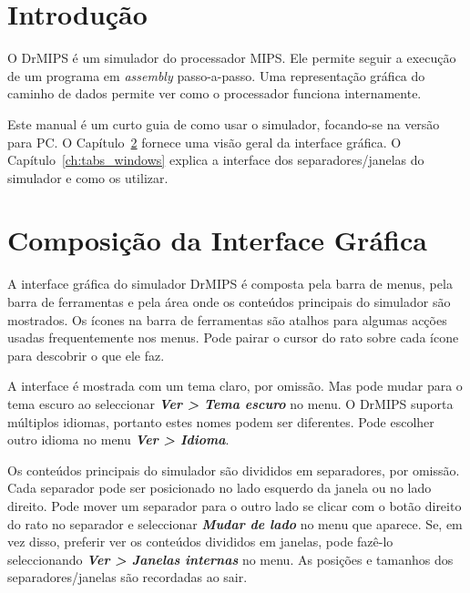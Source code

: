 \documentclass[11pt,a4paper,twoside,titlepage]{report}
\author{Bruno Nova}
\title{\Title}
\newcommand{\menupath}[1]{\textbf{\emph{#1}}}
\begin{document}
\maketitle
\tableofcontents


\chapter{Introdução}

O DrMIPS é um simulador do processador MIPS.
Ele permite seguir a execução de um programa em \emph{assembly}
passo-a-passo. Uma representação gráfica do caminho de dados permite ver
como o processador funciona internamente.

Este manual é um curto guia de como usar o simulador, focando-se
na versão para PC.
O Capítulo~\ref{ch:composition} fornece uma visão geral da interface gráfica.
O Capítulo~\ref{ch:tabs_windows} explica a interface dos separadores/janelas
do simulador e como os utilizar.


\chapter{Composição da Interface Gráfica} \label{ch:composition}

A interface gráfica do simulador DrMIPS é composta pela barra de menus, pela
barra de ferramentas e pela área onde os conteúdos principais do simulador são
mostrados.
Os ícones na barra de ferramentas são atalhos para algumas acções usadas
frequentemente nos menus. Pode pairar o cursor do rato sobre cada ícone para
descobrir o que ele faz.

A interface é mostrada com um tema claro, por omissão. Mas pode mudar para o
tema escuro ao seleccionar \menupath{Ver > Tema escuro} no menu.
O DrMIPS suporta múltiplos idiomas, portanto estes nomes podem ser diferentes.
Pode escolher outro idioma no menu \menupath{Ver > Idioma}.

Os conteúdos principais do simulador são divididos em separadores, por omissão.
Cada separador pode ser posicionado no lado esquerdo da janela ou no lado 
direito.
Pode mover um separador para o outro lado se clicar com o botão direito do rato
no separador e seleccionar \menupath{Mudar de lado} no menu que aparece.
Se, em vez disso, preferir ver os conteúdos divididos em janelas, pode fazê-lo
seleccionando \menupath{Ver > Janelas internas} no menu.
As posições e tamanhos dos separadores/janelas são recordadas ao sair.
\end{document}
